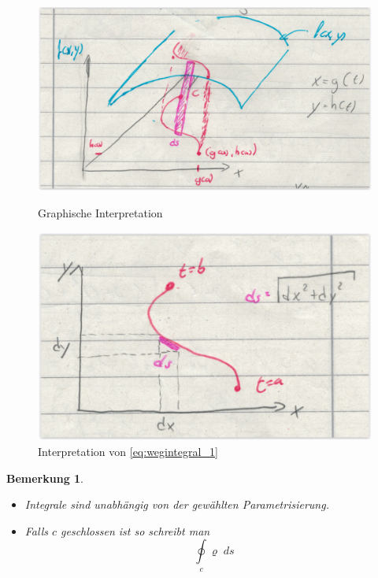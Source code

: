 \documentclass[12pt,a4paper]{article}%
\newtheorem{bem}{Bemerkung}[section]
\numberwithin{equation}{section}
\numberwithin{equation}{subsection}
\begin{document}
	  \begin{figure}[H] 
		\centering
		\begin{minipage}{.5\textwidth}
		  \centering
		  \includegraphics[width=0.9\linewidth]{wegintegral_erster_1.png}
		  \caption{Graphische Interpretation}
		  \label{fig:wegintegral_erster_1}
		\end{minipage}%
		\begin{minipage}{.5\textwidth}
		  \centering
		  \includegraphics[width=0.8\linewidth]{wegintegral_erster_2.png}
		  \caption{Interpretation von \protect\eqref{eq:wegintegral_1}}
		  \label{fig:wegintegral_erster_2}
		\end{minipage}
		\end{figure}
		\begin{bem}
			\begin{itemize}
			  \item[a) ] Integrale sind unabhängig von der gewählten Parametrisierung.
			  \item[b) ] Falls $c$ geschlossen ist so schreibt man 
				  \begin{equation}
				    \oint\limits_c \varrho \; ds
				  \end{equation}
			\end{itemize}
		\end{bem}
\end{document}
